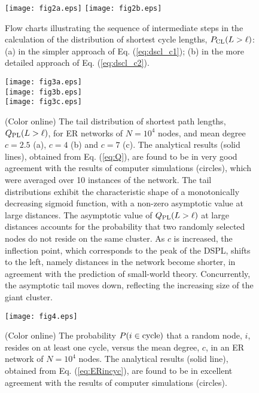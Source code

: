 \documentclass[preprint,pre,superscriptaddress,showpacs]{revtex4}
\begin{document}
\begin{figure}
\texttt{[image: fig2a.eps]}
\texttt{[image: fig2b.eps]}
\caption{
Flow charts illustrating the sequence of intermediate steps in the
calculation of the distribution of shortest cycle lengths,
$P_{\rm CL}(L>\ell)$: (a) in the
simpler approach of
Eq. (\ref{eq:dscl_c1}); 
(b) in the more detailed approach of
Eq. (\ref{eq:dscl_c2}).
}
\label{fig:2}
\end{figure}



\begin{figure}
\texttt{[image: fig3a.eps]} \\
\texttt{[image: fig3b.eps]} \\
\texttt{[image: fig3c.eps]}
\caption{
(Color online)
The tail distribution of shortest path lengths, 
$Q_{\rm PL}(L>\ell)$,  
for ER networks of $N=10^4$ nodes, 
and mean degree $c=2.5$ (a), $c=4$ (b) and $c=7$ (c).
The analytical results (solid lines),
obtained from Eq. (\ref{eq:Q}), 
are found to be in very good agreement
with the results of computer simulations (circles), 
which were averaged over 10 instances
of the network.
The tail distributions exhibit the characteristic shape of a monotonically
decreasing sigmoid function, with a non-zero asymptotic value
at large distances. 
The asymptotic value of 
$Q_{\rm PL}(L>\ell)$ 
at large distances accounts for the probability that
two randomly selected nodes do not reside on the same cluster.
As $c$ is increased, the inflection point,
which corresponds to the peak of the DSPL,
shifts to the left, namely distances in the network become shorter,
in agreement with the prediction of small-world theory.
Concurrently, the asymptotic tail moves down, 
reflecting the increasing size of the giant cluster.
}
\label{fig:3}
\end{figure}




\begin{figure}
\texttt{[image: fig4.eps]}
\caption{
(Color online)
The probability $P(i \in {\rm cycle})$ 
that a random node, $i$, resides on
at least one cycle, versus the mean degree, 
$c$, in an ER network of $N=10^4$ nodes.
The analytical results (solid line),
obtained from Eq. (\ref{eq:ERincyc}),
are found to be in excellent agreement with the
results of computer simulations (circles).
}
\label{fig:4}
\end{figure}
\end{document}
